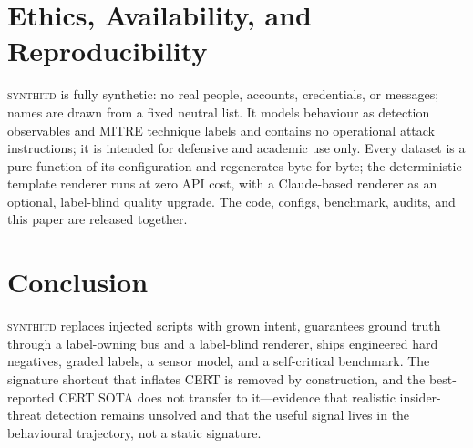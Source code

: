 \documentclass[11pt]{article}
\newcommand{\sys}{\textsc{synthitd}}
\begin{document}
\section{Ethics, Availability, and Reproducibility}
\sys{} is fully synthetic: no real people, accounts, credentials, or messages; names
are drawn from a fixed neutral list. It models behaviour as detection observables and
MITRE technique labels and contains no operational attack instructions; it is intended
for defensive and academic use only. Every dataset is a pure function of its
configuration and regenerates byte-for-byte; the deterministic template renderer runs
at zero API cost, with a Claude-based renderer as an optional, label-blind quality
upgrade. The code, configs, benchmark, audits, and this paper are released together.

\section{Conclusion}
\sys{} replaces injected scripts with grown intent, guarantees ground truth through a
label-owning bus and a label-blind renderer, ships engineered hard negatives, graded
labels, a sensor model, and a self-critical benchmark. The signature shortcut that
inflates CERT is removed by construction, and the best-reported CERT SOTA does not
transfer to it---evidence that realistic insider-threat detection remains unsolved and
that the useful signal lives in the behavioural trajectory, not a static signature.

\small

\end{document}
